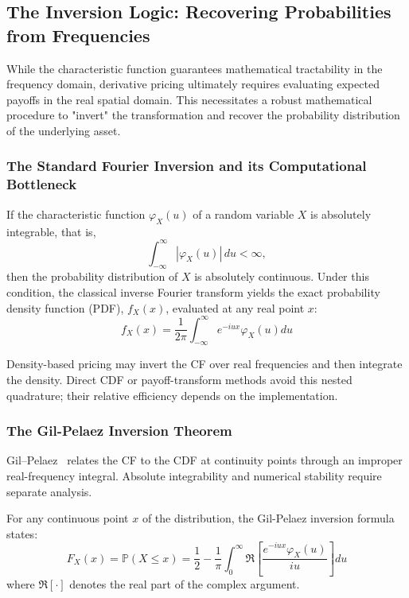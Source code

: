 \subsection{The Inversion Logic: Recovering Probabilities from Frequencies}
\label{sec:cf-inversion}

While the characteristic function guarantees mathematical tractability in the frequency domain, derivative pricing ultimately requires evaluating expected payoffs in the real spatial domain. This necessitates a robust mathematical procedure to "invert" the transformation and recover the probability distribution of the underlying asset.
\subsubsection{The Standard Fourier Inversion and its Computational Bottleneck}

If the characteristic function \(\varphi_X(u)\) of a random variable \(X\) is absolutely integrable, that is,
\[
\int_{-\infty}^{\infty} |\varphi_X(u)|\,du < \infty,
\]
then the probability distribution of \(X\) is absolutely continuous. Under this condition, the classical inverse Fourier transform yields the exact probability density function (PDF), \(f_X(x)\), evaluated at any real point \(x\):
\begin{equation}
    f_X(x) = \frac{1}{2\pi} \int_{-\infty}^{\infty} e^{-iux} \varphi_X(u) du
\end{equation}

Density-based pricing may invert the CF over real frequencies and
then integrate the density. Direct CDF or payoff-transform methods
avoid this nested quadrature; their relative efficiency depends on
the implementation.
\subsubsection{The Gil-Pelaez Inversion Theorem}

Gil--Pelaez~\cite{GilPelaez1951} relates the CF to the CDF at continuity points
through an improper real-frequency integral. Absolute integrability
and numerical stability require separate analysis.

For any continuous point $x$ of the distribution, the Gil-Pelaez inversion formula states:
\begin{equation}
    F_X(x) = \mathbb{P}(X \le x) = \frac{1}{2} - \frac{1}{\pi} \int_{0}^{\infty} \Re \left[ \frac{e^{-iux} \varphi_X(u)}{iu} \right] du
\end{equation}
where $\Re[\cdot]$ denotes the real part of the complex argument.

